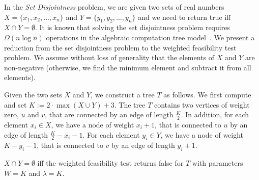 \documentclass[a4paper,UKenglish]{lipics-v2016}
\theoremstyle{plain}
\begin{document}
In the {\em Set Disjointness} problem, we are given two sets of real numbers $X=\lbrace x_1,x_2,\ldots,x_n \rbrace$ and $Y=\lbrace y_1,y_2,\ldots,y_n \rbrace$ and we need to return true iff $X \cap Y = \emptyset$. 
It is known that solving the set disjointness problem requires $\Omega(n \log n)$ operations in the algebraic
computation tree model~\cite{BenOr}.
We present a reduction from the set disjointness problem to the weighted feasibility test problem. We assume without loss of generality that the elements of $X$ and $Y$ are non-negative (otherwise,
we find the minimum element and subtract it from all elements).


Given the two sets $X$ and $Y$, we construct a tree $T$ as follows. We first compute and set
$K := 2 \cdot \max (X\cup Y) +3$.
The tree $T$ contains two vertices of weight zero, $u$ and $v$, that are connected by an edge of length $\frac{K}{2}$. In addition, for each element $x_i \in X$, we have a node of weight $x_i+1$, that is connected to $u$ by an edge of length $\frac{K}{2} - x_i -1$. For each element $y_i \in Y$, we have a node of weight $K - y_i -1$, that is connected to $v$ by an edge of length $y_i+1$.
\begin{lemma}\label{lemma of the reduction to set disjointness}
$X \cap Y = \emptyset$ iff the weighted feasibility test returns false for $T$ with  parameters $W=K$ and $\lambda =K$.
\end{lemma}
\end{document}
